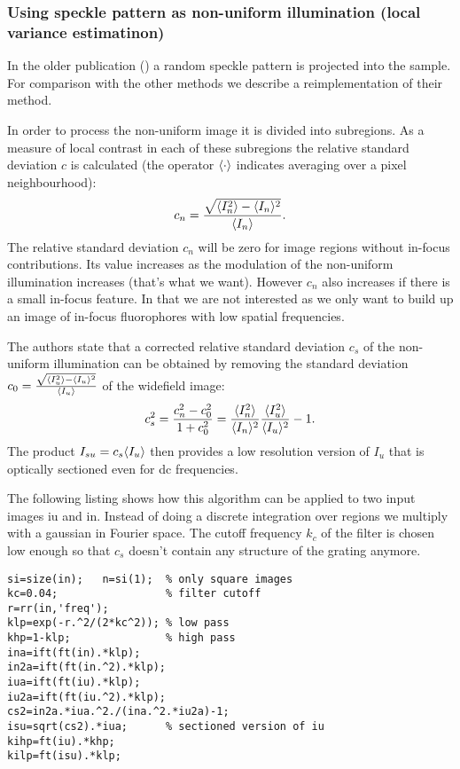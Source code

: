 \subsubsection{Using speckle pattern as non-uniform illumination (local variance estimatinon)}
In the older publication (\cite{2008Lim}) a random speckle pattern is
projected into the sample. For comparison with the other methods we
describe a reimplementation of their method.

In order to process the non-uniform image it is divided into
subregions.  As a measure of local contrast in each of these
subregions the relative standard deviation $c$ is calculated (the
operator $\langle \cdot \rangle$ indicates averaging over a pixel
neighbourhood):
\begin{align}
  c_n=\frac{\sqrt{\langle I_n^2 \rangle-\langle I_n \rangle^2}}{\langle I_n \rangle}.
\end{align}
The relative standard deviation $c_n$ will be zero for image regions
without in-focus contributions. Its value increases as the modulation
of the non-uniform illumination increases (that's what we
want). However $c_n$ also increases if there is a small in-focus
feature. In that we are not interested as we only want to build up an
image of in-focus fluorophores with low spatial frequencies. 

The authors state that a corrected relative standard deviation $c_s$
of the non-uniform illumination can be obtained by removing the
standard deviation
$c_0=\frac{\sqrt{\langle I_u^2 \rangle-\langle I_u \rangle^2}}{\langle I_u \rangle}$ of the
widefield image:
\begin{align} 
  c_s^2=\frac{c_n^2-c_0^2}{1+c_0^2}
  =
  \frac{\langle I_n^2 \rangle}{\langle I_n \rangle^2}
  \frac{\langle I_u^2 \rangle}{\langle I_u \rangle^2}-1.
\end{align}
The product $I_{su}=c_s\langle I_u \rangle$ then provides a low resolution
version of $I_u$ that is optically sectioned even for dc frequencies.

The following listing shows how this algorithm can be applied to two
input images {\sf iu} and {\sf in}. Instead of doing a discrete
integration over regions we multiply with a gaussian in Fourier
space. The cutoff frequency $k_c$ of the filter is chosen low enough
so that $c_s$ doesn't contain any structure of the grating anymore.
\begin{lstlisting}
si=size(in);   n=si(1);  % only square images
kc=0.04;                 % filter cutoff
r=rr(in,'freq');
klp=exp(-r.^2/(2*kc^2)); % low pass
khp=1-klp;               % high pass
ina=ift(ft(in).*klp);
in2a=ift(ft(in.^2).*klp);
iua=ift(ft(iu).*klp);
iu2a=ift(ft(iu.^2).*klp);
cs2=in2a.*iua.^2./(ina.^2.*iu2a)-1;
isu=sqrt(cs2).*iua;      % sectioned version of iu
kihp=ft(iu).*khp;
kilp=ft(isu).*klp;
\end{lstlisting}

